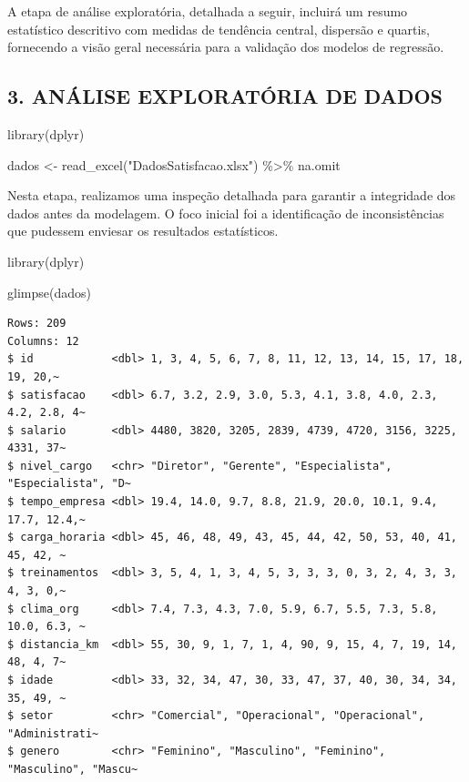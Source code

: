 \documentclass[
  letterpaper,
  DIV=11,
  numbers=noendperiod]{scrartcl}
\newenvironment{Shaded}{\begin{snugshade}}{\end{snugshade}}
\newcommand{\FunctionTok}[1]{\textcolor[rgb]{0.28,0.35,0.67}{#1}}
\newcommand{\NormalTok}[1]{\textcolor[rgb]{0.00,0.23,0.31}{#1}}
\newcommand{\OtherTok}[1]{\textcolor[rgb]{0.00,0.23,0.31}{#1}}
\newcommand{\SpecialCharTok}[1]{\textcolor[rgb]{0.37,0.37,0.37}{#1}}
\newcommand{\StringTok}[1]{\textcolor[rgb]{0.13,0.47,0.30}{#1}}
\begin{document}
A etapa de análise exploratória, detalhada a seguir, incluirá um resumo
estatístico descritivo com medidas de tendência central, dispersão e
quartis, fornecendo a visão geral necessária para a validação dos
modelos de regressão.

\subsection{\texorpdfstring{\textbf{3. ANÁLISE EXPLORATÓRIA DE
DADOS}}{3. ANÁLISE EXPLORATÓRIA DE DADOS}}\label{anuxe1lise-exploratuxf3ria-de-dados}

\begin{Shaded}
\begin{Highlighting}[]
\FunctionTok{library}\NormalTok{(dplyr)}

\NormalTok{dados }\OtherTok{\textless{}{-}} \FunctionTok{read\_excel}\NormalTok{(}\StringTok{"DadosSatisfacao.xlsx"}\NormalTok{) }\SpecialCharTok{\%\textgreater{}\%}\NormalTok{ na.omit}
\end{Highlighting}
\end{Shaded}

Nesta etapa, realizamos uma inspeção detalhada para garantir a
integridade dos dados antes da modelagem. O foco inicial foi a
identificação de inconsistências que pudessem enviesar os resultados
estatísticos.

\begin{Shaded}
\begin{Highlighting}[]
\FunctionTok{library}\NormalTok{(dplyr)}

\FunctionTok{glimpse}\NormalTok{(dados)}
\end{Highlighting}
\end{Shaded}

\begin{verbatim}
Rows: 209
Columns: 12
$ id            <dbl> 1, 3, 4, 5, 6, 7, 8, 11, 12, 13, 14, 15, 17, 18, 19, 20,~
$ satisfacao    <dbl> 6.7, 3.2, 2.9, 3.0, 5.3, 4.1, 3.8, 4.0, 2.3, 4.2, 2.8, 4~
$ salario       <dbl> 4480, 3820, 3205, 2839, 4739, 4720, 3156, 3225, 4331, 37~
$ nivel_cargo   <chr> "Diretor", "Gerente", "Especialista", "Especialista", "D~
$ tempo_empresa <dbl> 19.4, 14.0, 9.7, 8.8, 21.9, 20.0, 10.1, 9.4, 17.7, 12.4,~
$ carga_horaria <dbl> 45, 46, 48, 49, 43, 45, 44, 42, 50, 53, 40, 41, 45, 42, ~
$ treinamentos  <dbl> 3, 5, 4, 1, 3, 4, 5, 3, 3, 3, 0, 3, 2, 4, 3, 3, 4, 3, 0,~
$ clima_org     <dbl> 7.4, 7.3, 4.3, 7.0, 5.9, 6.7, 5.5, 7.3, 5.8, 10.0, 6.3, ~
$ distancia_km  <dbl> 55, 30, 9, 1, 7, 1, 4, 90, 9, 15, 4, 7, 19, 14, 48, 4, 7~
$ idade         <dbl> 33, 32, 34, 47, 30, 33, 47, 37, 40, 30, 34, 34, 35, 49, ~
$ setor         <chr> "Comercial", "Operacional", "Operacional", "Administrati~
$ genero        <chr> "Feminino", "Masculino", "Feminino", "Masculino", "Mascu~
\end{verbatim}
\end{document}
